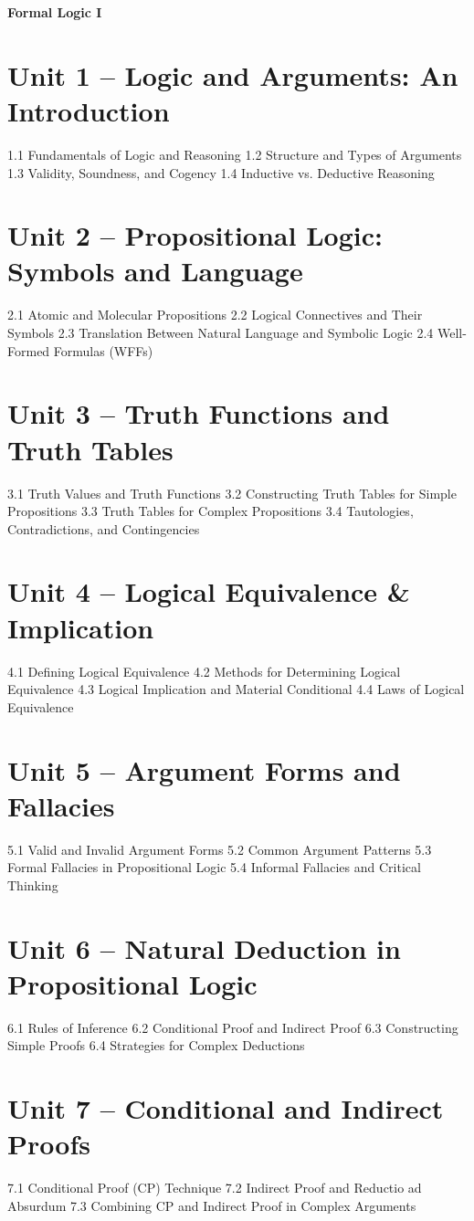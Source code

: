 ﻿{\LARGE \bf{Formal Logic I}}
\section{Unit 1 – Logic and Arguments: An Introduction}
1.1 Fundamentals of Logic and Reasoning
1.2 Structure and Types of Arguments
1.3 Validity, Soundness, and Cogency
1.4 Inductive vs. Deductive Reasoning
\section{Unit 2 – Propositional Logic: Symbols and Language}
2.1 Atomic and Molecular Propositions
2.2 Logical Connectives and Their Symbols
2.3 Translation Between Natural Language and Symbolic Logic
2.4 Well-Formed Formulas (WFFs)
\section{Unit 3 – Truth Functions and Truth Tables}
3.1 Truth Values and Truth Functions
3.2 Constructing Truth Tables for Simple Propositions
3.3 Truth Tables for Complex Propositions
3.4 Tautologies, Contradictions, and Contingencies
\section{Unit 4 – Logical Equivalence \& Implication}
4.1 Defining Logical Equivalence
4.2 Methods for Determining Logical Equivalence
4.3 Logical Implication and Material Conditional
4.4 Laws of Logical Equivalence
\section{Unit 5 – Argument Forms and Fallacies}
5.1 Valid and Invalid Argument Forms
5.2 Common Argument Patterns
5.3 Formal Fallacies in Propositional Logic
5.4 Informal Fallacies and Critical Thinking
\section{Unit 6 – Natural Deduction in Propositional Logic}
6.1 Rules of Inference
6.2 Conditional Proof and Indirect Proof
6.3 Constructing Simple Proofs
6.4 Strategies for Complex Deductions
\section{Unit 7 – Conditional and Indirect Proofs}
7.1 Conditional Proof (CP) Technique
7.2 Indirect Proof and Reductio ad Absurdum
7.3 Combining CP and Indirect Proof in Complex Arguments
